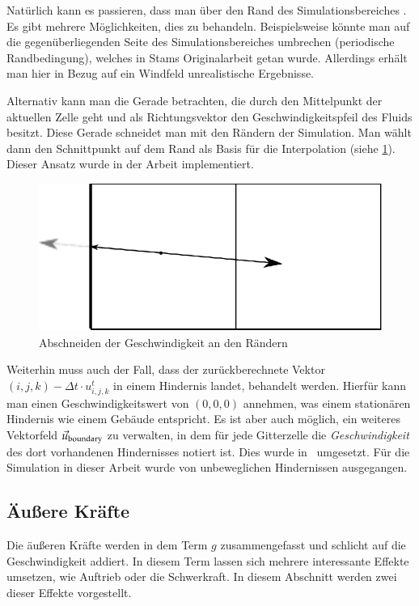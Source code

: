 Natürlich kann es passieren, dass man über den Rand des Simulationsbereiches
. Es gibt mehrere Möglichkeiten, dies zu behandeln.
Beispielsweise könnte man auf die gegenüberliegenden Seite des
Simulationsbereiches umbrechen (periodische Randbedingung), welches in
Stams Originalarbeit getan wurde. Allerdings erhält man hier in Bezug
auf ein Windfeld unrealistische Ergebnisse.

Alternativ kann man die Gerade betrachten, die durch den Mittelpunkt
der aktuellen Zelle geht und als Richtungsvektor den
Geschwindigkeitspfeil des Fluids besitzt. Diese Gerade schneidet man
mit den Rändern der Simulation. Man wählt dann den Schnittpunkt auf
dem Rand als Basis für die Interpolation (siehe
\cref{fig:stam_clamping_borders}). Dieser Ansatz wurde in der Arbeit
implementiert.

\begin{figure}[ht]
\centering
\includegraphics[width=12cm]{images/advection_clamping_borders}
\caption{Abschneiden der Geschwindigkeit an den Rändern}
\label{fig:stam_clamping_borders}
\end{figure}

Weiterhin muss auch der Fall, dass der zurückberechnete Vektor
$(i,j,k) - \Delta t \cdot u_{i,j,k}^t$ in einem Hindernis landet,
behandelt werden. Hierfür kann man einen Geschwindigkeitswert
von $(0,0,0)$ annehmen, was einem stationären Hindernis wie einem
Gebäude entspricht. Es ist aber auch möglich, ein weiteres Vektorfeld
$\vec{u}_{\textnormal{boundary}}$ zu verwalten, in dem für jede
Gitterzelle die \emph{Geschwindigkeit} des dort vorhandenen
Hindernisses notiert ist. Dies wurde in~\cite{Crane2007}
umgesetzt. Für die Simulation in dieser Arbeit wurde von unbeweglichen
Hindernissen ausgegangen.

\subsection{Äußere Kräfte}

Die äußeren Kräfte werden in dem Term $g$ zusammengefasst und schlicht
auf die Geschwindigkeit addiert. In diesem Term lassen sich mehrere
interessante Effekte umsetzen, wie Auftrieb oder die Schwerkraft. In
diesem Abschnitt werden zwei dieser Effekte vorgestellt.

